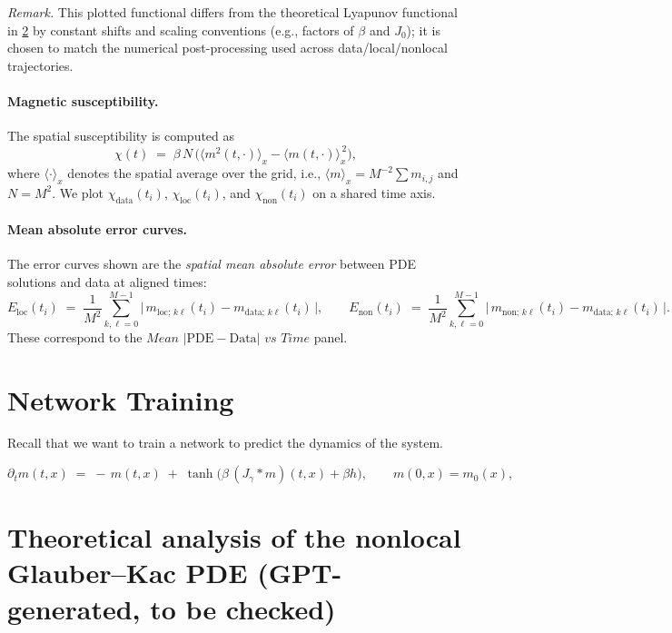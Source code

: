 \documentclass[11pt,a4paper]{article}
\begin{document}
\emph{Remark.} This plotted functional differs from the theoretical Lyapunov functional in \cref{sec:nonlocal_theory} by constant shifts and scaling conventions (e.g., factors of $\beta$ and $J_0$); it is chosen to match the numerical post-processing used across data/local/nonlocal trajectories.

\paragraph{Magnetic susceptibility.} The spatial susceptibility is computed as
\begin{equation}
    \chi(t) \;=\; \beta\,N\,\Big( \langle m^2(t,\cdot)\rangle_x - \langle m(t,\cdot)\rangle_x^{\,2} \Big),
\end{equation}
where $\langle\cdot\rangle_x$ denotes the spatial average over the grid, i.e., $\langle m\rangle_x = M^{-2}\sum m_{i,j}$ and $N=M^2$. We plot $\chi_{\text{data}}(t_i)$, $\chi_{\text{loc}}(t_i)$, and $\chi_{\text{non}}(t_i)$ on a shared time axis.

\paragraph{Mean absolute error curves.} The error curves shown are the \emph{spatial mean absolute error} between PDE solutions and data at aligned times:
\begin{equation}
    E_{\text{loc}}(t_i) \;=\; \frac{1}{M^2} \sum_{k,\ell=0}^{M-1} \big|\, m_{\text{loc};\,k\ell}(t_i) - m_{\text{data};\,k\ell}(t_i) \,\big|,
    \qquad
    E_{\text{non}}(t_i) \;=\; \frac{1}{M^2} \sum_{k,\ell=0}^{M-1} \big|\, m_{\text{non};\,k\ell}(t_i) - m_{\text{data};\,k\ell}(t_i) \,\big|.
\end{equation}
These correspond to the $\textit{Mean $|\mathrm{PDE}-\mathrm{Data}|$ vs Time}$ panel.

\section{Network Training}

Recall that we want to train a network to predict the dynamics of the system.

\begin{equation}\label{eq:nonlocal-recall}
\partial_t m(t,x) \;=\; -\,m(t,x)\;+\;\tanh\!\Big(\beta\, (J_\gamma * m)(t,x) + \beta h\Big), \qquad m(0,x)=m_0(x),
\end{equation}

\section{Theoretical analysis of the nonlocal Glauber--Kac PDE (GPT-generated, to be checked)} 
\label{sec:nonlocal_theory}
\end{document}
